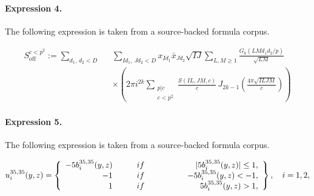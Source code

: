\documentclass[11pt]{article}
\begin{document}
\paragraph{Expression 4.} The following expression is taken from a source-backed formula corpus.

\begin{align*} S_{\mathrm{off}}^{c<p^2}:=\sum_{d_1,\,d_2<D} \,\, \,\ &\sum_{Id_1, \,Jd_2<D}x_{Id_1}\bar{x}_{Jd_2}\sqrt{IJ}\sum_{L, M\geq 1}\frac{G_k(LMd_1d_2\slash p)}{\sqrt{LM}} \\ &\times\left(2 \pi i^{2k} \sum_{\substack{p|c\\ c <p^2}}\frac{\mathcal{S}(IL, JM, c )}{c} \,J_{2k-1}\left(\frac{4\pi \sqrt{ILJM}}{c}\right)\right)\end{align*}

\paragraph{Expression 5.} The following expression is taken from a source-backed formula corpus.

\begin{align*}u^{35,35}_i(y,z)=\left\{\begin{array}{rrrl}- 5 b_i^{35,35}(y,z) \ & \ \ \ \ \ if& \ \ \ \ \ \ \ \ \ \ \ \ |5 b_i^{35,35}(y,z)|\leq 1, \\-1 \ & \ \ \ \ \ if& \ \ \ \ \ \ \ \ \ \ \ \ \ -5 b_i^{35,35}(y,z) < -1,\\1 \ & \ \ \ \ \ if& \ \ \ \ \ \ \ \ \ \ \ \ \-5 b_i^{35,35}(y,z) > 1,\\\end{array}\right\},\ \ \ i=1,2,\end{align*}
\end{document}
